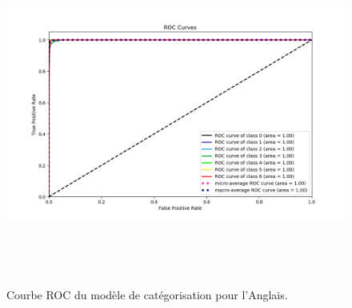     \begin{figure}[H]
        \centering
        \includegraphics[height=320pt,width=330pt]{img/chapter4/result/rocEN.png}
        \caption{Courbe ROC du modèle de catégorisation pour l'Anglais.}
        \label{roc-en}
    \end{figure}

